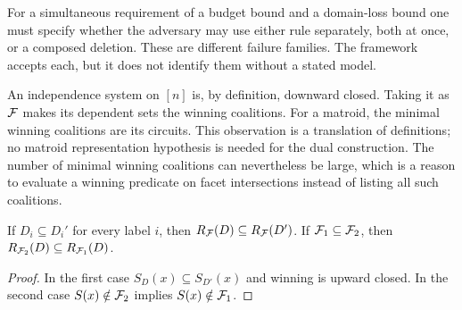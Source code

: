 For a simultaneous requirement of a budget bound and a domain-loss bound one must specify whether the adversary may use either rule separately, both at once, or a composed deletion. These are different failure families. The framework accepts each, but it does not identify them without a stated model.

\begin{example}
An independence system on $[n]$ is, by definition, downward closed. Taking it as $\mathcal F$ makes its dependent sets the winning coalitions. For a matroid, the minimal winning coalitions are its circuits. This observation is a translation of definitions; no matroid representation hypothesis is needed for the dual construction. The number of minimal winning coalitions can nevertheless be large, which is a reason to evaluate a winning predicate on facet intersections instead of listing all such coalitions.
\end{example}

\begin{lemma}[Monotonicity]\label{lem:monotonicity}
If $D_i\subseteq D_i'$ for every label $i$, then $R_{\mathcal F}(D)\subseteq R_{\mathcal F}(D')$. If $\mathcal F_1\subseteq\mathcal F_2$, then $R_{\mathcal F_2}(D)\subseteq R_{\mathcal F_1}(D)$.
\end{lemma}
\begin{proof}
In the first case $S_D(x)\subseteq S_{D'}(x)$ and winning is upward closed. In the second case $S(x)\notin\mathcal F_2$ implies $S(x)\notin\mathcal F_1$.
\end{proof}
